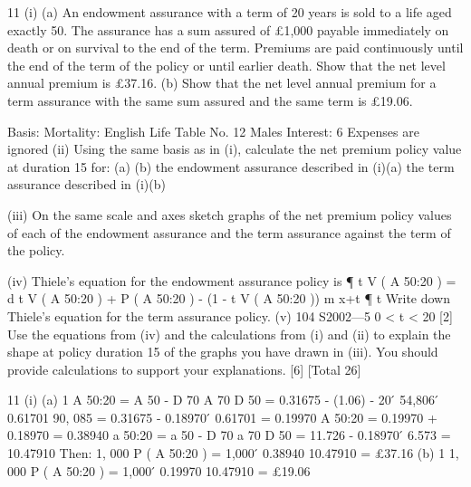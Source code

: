 \documentclass[a4paper,12pt]{article}
\begin{document}
\begin{enumerate}
11
(i)
(a)
An endowment assurance with a term of 20 years is sold to a life aged
exactly 50. The assurance has a sum assured of £1,000 payable
immediately on death or on survival to the end of the term. Premiums
are paid continuously until the end of the term of the policy or until
earlier death.
Show that the net level annual premium is £37.16.
(b)
Show that the net level annual premium for a term assurance with the
same sum assured and the same term is £19.06.

Basis: Mortality: English Life Table No. 12 Males
Interest: 6%
Expenses are ignored
(ii)
Using the same basis as in (i), calculate the net premium policy value at
duration 15 for:
(a)
(b)
the endowment assurance described in (i)(a)
the term assurance described in (i)(b)

(iii) On the same scale and axes sketch graphs of the net premium policy values of
each of the endowment assurance and the term assurance against the term of
the policy.

(iv) Thiele’s equation for the endowment assurance policy is
¶
t V ( A 50:20 ) = d t V ( A 50:20 ) + P ( A 50:20 ) - (1 - t V ( A 50:20 )) m x+t
¶ t
Write down Thiele’s equation for the term assurance policy.
(v)
104 S2002—5
0 < t < 20
[2]
Use the equations from (iv) and the calculations from (i) and (ii) to explain the
shape at policy duration 15 of the graphs you have drawn in (iii). You should
provide calculations to support your explanations.
[6]
[Total 26]


\newpage 

11
(i)
(a)
1
A 50:20
= A 50 -
D 70
A 70
D 50
= 0.31675 - (1.06) - 20  ́
54,806
 ́ 0.61701
90, 085
= 0.31675 - 0.18970  ́ 0.61701
= 0.19970
A 50:20 = 0.19970 + 0.18970 = 0.38940
a 50:20 = a 50 -
D 70
a 70
D 50
= 11.726 - 0.18970  ́ 6.573
= 10.47910
Then: 1, 000 P ( A 50:20 ) = 1,000  ́
0.38940
10.47910
= £37.16
(b)
1
1, 000 P ( A 50:20
) = 1,000  ́
0.19970
10.47910
= £19.06
\newpage


\end{enumerate}
\end{document}
